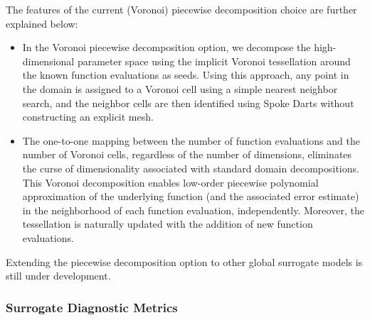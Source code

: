 The features of the current (Voronoi) piecewise decomposition choice are further explained below: 

\begin{itemize}
	\item In the Voronoi piecewise decomposition option, we decompose the high-dimensional parameter space using the implicit Voronoi tessellation around the known function evaluations as seeds. Using this approach, any point in the domain is assigned to a Voronoi cell using a simple nearest neighbor search, and the neighbor cells are then identified using Spoke Darts without constructing an explicit mesh. 
	\item The one-to-one mapping between the number of function evaluations and the number of Voronoi cells, regardless of the number of dimensions, eliminates the curse of dimensionality associated with standard domain decompositions. This Voronoi decomposition enables low-order piecewise polynomial approximation of the underlying function (and the associated error estimate) in the neighborhood of each function evaluation, independently. Moreover, the tessellation is naturally updated with the addition of new function evaluations.  
\end{itemize}

Extending the piecewise decomposition option to other global surrogate models is still under development. 


\subsubsection{Surrogate Diagnostic Metrics}\label{models:surf:diagnostics}

